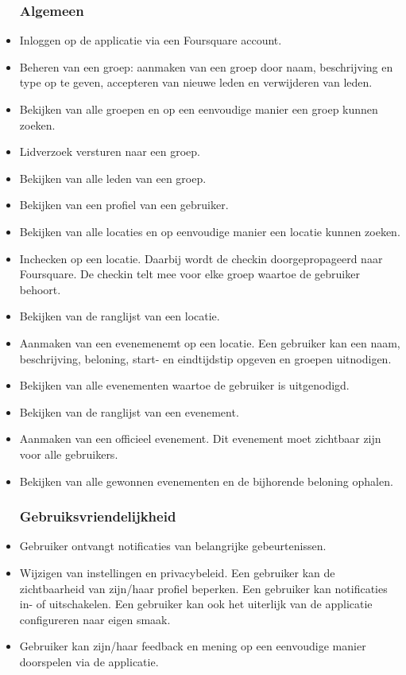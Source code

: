 \begin{itemize}
	
\subsubsection{Algemeen}
\item Inloggen op de applicatie via een Foursquare account.
\item Beheren van een groep: aanmaken van een groep door naam, beschrijving en type op te geven, accepteren van nieuwe leden en verwijderen van leden.   
\item Bekijken van alle groepen en op een eenvoudige manier een groep kunnen zoeken.
\item Lidverzoek versturen naar een groep.
\item Bekijken van alle leden van een groep.
\item Bekijken van een profiel van een gebruiker.
\item Bekijken van alle locaties en op eenvoudige manier een locatie kunnen zoeken.
\item Inchecken op een locatie. Daarbij wordt de checkin doorgepropageerd naar Foursquare. De checkin telt mee voor elke groep waartoe de gebruiker behoort. 
\item Bekijken van de ranglijst van een locatie.
\item Aanmaken van een evenemenemt op een locatie. Een gebruiker kan een naam, beschrijving, beloning, start- en eindtijdstip opgeven en groepen uitnodigen.
\item Bekijken van alle evenementen waartoe de gebruiker is uitgenodigd.
\item Bekijken van de ranglijst van een evenement.
\item Aanmaken van een officieel evenement. Dit evenement moet zichtbaar zijn voor alle gebruikers.
\item Bekijken van alle gewonnen evenementen en de bijhorende beloning ophalen.

\subsubsection{Gebruiksvriendelijkheid}

\item Gebruiker ontvangt notificaties van belangrijke gebeurtenissen.
\item Wijzigen van instellingen en privacybeleid. Een gebruiker kan de zichtbaarheid van zijn/haar profiel beperken. Een gebruiker kan notificaties in- of uitschakelen. Een gebruiker kan ook het uiterlijk van de applicatie configureren naar eigen smaak.
\item Gebruiker kan zijn/haar feedback en mening op een eenvoudige manier doorspelen via de applicatie.

\end{itemize}

